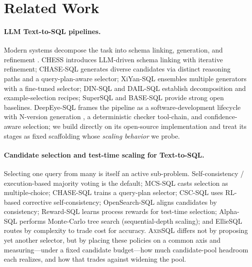 \documentclass{article}
\newcommand{\sys}{\textsc{AxisSQL}\xspace}
\begin{document}
\section{Related Work}
\label{sec:related}

\paragraph{LLM Text-to-SQL pipelines.}
Modern systems decompose the task into schema linking, generation, and refinement \citep{liu2025survey}. CHESS \citep{talaei2024chess} introduces LLM-driven schema linking with iterative refinement; CHASE-SQL \citep{pourreza2025chase} generates diverse candidates via distinct reasoning paths and a query-plan-aware selector; XiYan-SQL \citep{liu2025xiyan} ensembles multiple generators with a fine-tuned selector; DIN-SQL \citep{pourreza2023dinsql} and DAIL-SQL \citep{gao2024dailsql} establish decomposition and example-selection recipes; SuperSQL \citep{li2024superSQL} and BASE-SQL \citep{sheng2025basesql} provide strong open baselines. DeepEye-SQL \citep{li2026deepeye} frames the pipeline as a software-development lifecycle with N-version generation \citep{chen1978nversion}, a deterministic checker tool-chain, and confidence-aware selection; we build directly on its open-source implementation and treat its stages as fixed scaffolding whose \emph{scaling behavior} we probe.

\paragraph{Candidate selection and test-time scaling for Text-to-SQL.}
Selecting one query from many is itself an active sub-problem. Self-consistency / execution-based majority voting \citep{wang2023selfconsistency} is the default; MCS-SQL \citep{lee2024mcssql} casts selection as multiple-choice; CHASE-SQL \citep{pourreza2025chase} trains a query-plan selector; CSC-SQL \citep{sheng2025cscsql} uses RL-based corrective self-consistency; OpenSearch-SQL \citep{xie2025opensearch} aligns candidates by consistency; Reward-SQL \citep{zhang2025rewardsql} learns process rewards for test-time selection; Alpha-SQL \citep{li2025alphasql} performs Monte-Carlo tree search (sequential-depth scaling); and EllieSQL \citep{zhu2025elliesql} routes by complexity to trade cost for accuracy. \sys{} differs not by proposing yet another selector, but by placing these policies on a common axis and measuring---under a fixed candidate budget---how much candidate-pool headroom each realizes, and how that trades against widening the pool.
\end{document}
